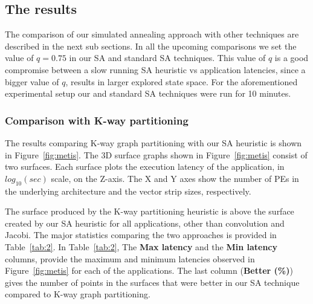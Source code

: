 \subsection{The results}
\label{sec:results}

The comparison of our simulated annealing approach with other techniques
are described in the next sub sections. In all the upcoming comparisons
we set the value of $q=0.75$ in our SA and standard SA techniques. This
value of $q$ is a good compromise between a slow running SA heuristic vs
application latencies, since a bigger value of $q$, results in larger
explored state space. For the aforementioned experimental setup our and
standard SA techniques were run for 10 minutes.

\subsubsection{Comparison with K-way partitioning}
\label{sec:comparison-with-k}

The results comparing K-way graph partitioning with our SA heuristic is
shown in Figure~\ref{fig:metis}. The 3D surface graphs shown in
Figure~\ref{fig:metis} consist of two surfaces. Each surface plots the
execution latency of the application, in $log_{10}(sec)$ scale, on the
Z-axis. The X and Y axes show the number of PEs in the underlying
architecture and the vector strip sizes, respectively.

The surface produced by the K-way partitioning heuristic is above the
surface created by our SA heuristic for all applications, other than
convolution and Jacobi. The major statistics comparing the two
approaches is provided in Table~\ref{tab:2}. In Table~\ref{tab:2}, The
\textbf{Max latency} and the \textbf{Min latency} columns, provide the
maximum and minimum latencies observed in Figure~\ref{fig:metis} for
each of the applications. The last column (\textbf{Better (\%)}) gives
the number of points in the surfaces that were better in our SA
technique compared to K-way graph partitioning.

